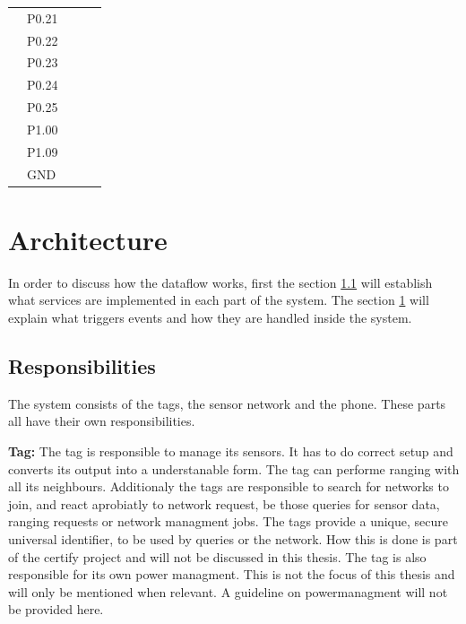 \begin{table}[]
\begin{tabular}{l|l|l|l|l|}
		\multicolumn{1}{|l|}{} & P0.21  &               &             &             \\
		\multicolumn{1}{|l|}{} & P0.22  &               &             &             \\
		\multicolumn{1}{|l|}{} & P0.23  &               &             &             \\
		\multicolumn{1}{|l|}{} & P0.24  &               &             &             \\
		\multicolumn{1}{|l|}{} & P0.25  &               &             &             \\
		\multicolumn{1}{|l|}{} & P1.00  &               &             &             \\
		\multicolumn{1}{|l|}{} & P1.09  &               &             &             \\
		\multicolumn{1}{|l|}{} & GND    &               &             &             \\
		\hline
	\end{tabular}
\end{table}


\section{Architecture}
\label{ss:dataflow}

In order to discuss how the dataflow works, first the section \ref{ss:responsibility} will establish what services are implemented in each part of the system.
The section \ref{ss:dataflow} will explain what triggers events and how they are handled inside the system.

\subsection{Responsibilities}
\label{ss:responsibility}
The system consists of the tags, the sensor network and the phone.
These parts all have their own responsibilities.

\textbf{Tag:} 
The tag is responsible to manage its sensors. 
It has to do correct setup and converts its output into a understanable form.
The tag can performe ranging with all its neighbours.
Additionaly the tags are responsible to search for networks to join, and react aprobiatly to network request, be those queries for sensor data, ranging requests or network managment jobs. 
The tags provide a unique, secure universal identifier, to be used by queries or the network.
How this is done is part of the certify project and will not be discussed in this thesis.
The tag is also responsible for its own power managment.
This is not the focus of this thesis and will only be mentioned when relevant.
A guideline on powermanagment will not be provided here.

